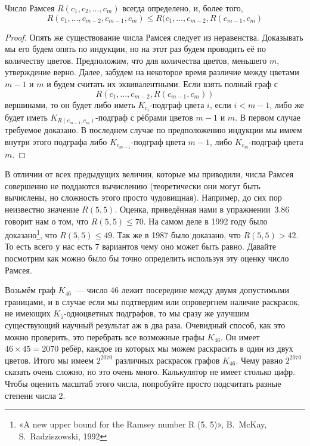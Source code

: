 \begin{thm}
Число Рамсея $R(c_1, c_2, \ldots, c_m)$ всегда определено, и, более того,
$$R(c_1, \ldots,c_{m-2}, c_{m-1}, c_m) \le R(c_1, \ldots, c_{m-2}, R(c_{m-1}, c_m)$$
\end{thm}
\begin{proof}
Опять же существование числа Рамсея следует из неравенства. Доказывать мы его будем опять по индукции, но на этот раз будем проводить её по количеству цветов. Предположим, что для количества цветов, меньшего $m$, утверждение верно. Далее, забудем на некоторое время различие между цветами $m-1$ и $m$ и будем считать их эквивалентными. Если взять полный граф с
$$R(c_1, \ldots, c_{m-2}, R(c_{m-1}, c_m))$$
вершинами, то он будет либо иметь $K_{c_i}$-подграф цвета $i$, если $i<m-1$, либо же будет иметь $K_{R(c_{m-1}, c_m)}$-подграф с рёбрами цветов $m-1$ и $m$. В первом случае требуемое доказано. В последнем случае по предположению индукции мы имеем внутри этого подграфа либо $K_{c_{m-1}}$-подграф цвета $m-1$, либо $K_{c_m}$-подграф цвета $m$.
\end{proof}

В отличии от всех предыдущих величин, которые мы приводили, числа Рамсея совершенно не поддаются вычислению (теоретически они могут быть вычислены, но сложность этого просто чудовищная). Например, до сих пор неизвестно значение $R(5, 5)$. Оценка, приведённая нами в упражнении~3.86 говорит нам о том, что $R(5, 5)\le70$. На самом деле в 1992 году было доказано\footnote{«A new upper bound for the Ramsey number R (5, 5)», B.~McKay, S.~Radziszowski, 1992}, что $R(5, 5)\le 49$. Так же в 1987 было доказано, что $R(5, 5) > 42$. То есть всего у нас есть 7 вариантов чему оно может быть равно. Давайте посмотрим как можно было бы точно определить используя эту оценку число Рамсея.

Возьмём граф $K_{46}$~— число 46 лежит посередине между двумя допустимыми границами, и в случае если мы подтвердим или опровергнем наличие раскрасок, не имеющих $K_5$-одноцветных подграфов, то мы сразу же улучшим существующий научный результат аж в два раза. Очевидный способ, как это можно проверить, это перебрать все возможные графы $K_{46}$. Он имеет $46\times45 = 2070$ ребёр, каждое из которых мы можем раскрасить в один из двух цветов. Итого мы имеем $2^{2070}$ различных раскрасок графов $K_{46}$. Чему равно $2^{2070}$ сказать очень сложно, но это очень много. Калькулятор не имеет столько цифр. Чтобы оценить масштаб этого числа, попробуйте просто подсчитать разные степени числа 2.

